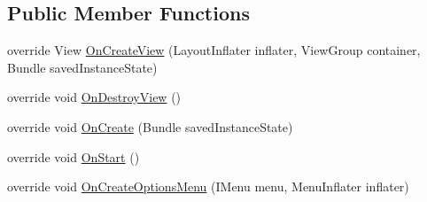 \subsection*{Public Member Functions}
\begin{DoxyCompactItemize}
\item 
override View \hyperlink{class_s_q_lite_1_1_android_1_1_sample_1_1_list_fragment_a1105df10776927fc84f501abc25735ec}{On\+Create\+View} (Layout\+Inflater inflater, View\+Group container, Bundle saved\+Instance\+State)
\item 
override void \hyperlink{class_s_q_lite_1_1_android_1_1_sample_1_1_list_fragment_a1f21401c178746522238a61bd8b3ce7d}{On\+Destroy\+View} ()
\item 
override void \hyperlink{class_s_q_lite_1_1_android_1_1_sample_1_1_list_fragment_a6745124a1b4fbf1e28f7e5b03d33b57a}{On\+Create} (Bundle saved\+Instance\+State)
\item 
override void \hyperlink{class_s_q_lite_1_1_android_1_1_sample_1_1_list_fragment_aca8098004c5d7bcbef7a4c5fc7155c51}{On\+Start} ()
\item 
override void \hyperlink{class_s_q_lite_1_1_android_1_1_sample_1_1_list_fragment_a4348c7af885956608f421f5cef59e9c3}{On\+Create\+Options\+Menu} (I\+Menu menu, Menu\+Inflater inflater)
\end{DoxyCompactItemize}


